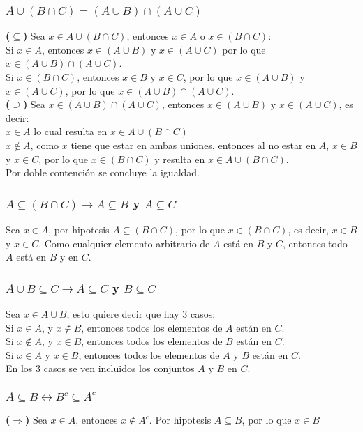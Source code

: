 \documentclass[a4paper]{article}
\begin{document}
\subsubsection{$A\cup (B\cap C)=(A\cup B)\cap(A\cup C)$}
\textbf{($\subseteq$)} Sea $x \in A\cup (B\cap C)$, entonces $x \in A$ o $x \in (B\cap C)$:\\
Si $x \in A$, entonces $x \in (A\cup B)$ y $x \in (A\cup C)$ por lo que $x \in (A\cup B)\cap(A\cup C)$.\\
Si $x \in (B\cap C)$, entonces $x \in B$ y $x \in C$, por lo que $x \in (A\cup B)$ y $x \in (A\cup C)$, por lo que $x \in (A\cup B)\cap(A\cup C)$.\\
\textbf{($\supseteq$)} Sea $x \in (A\cup B)\cap(A\cup C)$, entonces $x \in (A\cup B)$ y $x \in (A\cup C)$, es decir:\\
$x \in A$ lo cual resulta en $x \in A\cup (B\cap C)$\\
$x \notin A$, como $x$ tiene que estar en ambas uniones, entonces al no estar en $A$, $x \in B$ y $x \in C$, por lo que $x \in (B\cap C)$ y resulta en $x \in A\cup (B\cap C)$.\\
Por doble contención se concluye la igualdad.

\subsubsection{$A \subseteq (B\cap C) \rightarrow A \subseteq B$ y $A \subseteq C$}
Sea $x \in A$, por hipotesis $A \subseteq (B\cap C)$, por lo que $x \in (B\cap C)$, es decir, $x \in B$ y $x \in C$. Como cualquier elemento arbitrario de $A$ está en $B$ y $C$, entonces todo $A$ está en $B$ y en $C$.

\subsubsection{$A\cup B \subseteq C \rightarrow A \subseteq C$ y $B \subseteq C$}
Sea $x \in A\cup B$, esto quiere decir que hay 3 casos:\\
Si $x \in A$, y $x \notin B$, entonces todos los elementos de $A$ están en $C$.\\
Si $x \notin A$, y $x \in B$, entonces todos los elementos de $B$ están en $C$.\\
Si $x \in A$ y $x \in B$, entonces todos los elementos de $A$ y $B$ están en $C$.\\
En los 3 casos se ven incluidos los conjuntos $A$ y $B$ en $C$.

\subsubsection{$A \subseteq B \leftrightarrow B^{c} \subseteq A^{c}$}
\textbf{($\Rightarrow$)} Sea $x \in A$, entonces $x \notin A^{c}$. Por hipotesis $A \subseteq B$, por lo que $x \in B$
\end{document}
